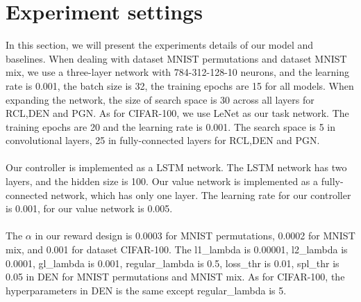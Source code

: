 \documentclass{article}
\begin{document}
\section{Experiment settings}
In this section, we will present the experiments details of our model and baselines. When dealing with dataset MNIST permutations and dataset MNIST mix, we use a three-layer network with 784-312-128-10 neurons, and the learning rate is 0.001, the batch size is 32, the training epochs are 15 for all models. When expanding the network, the size of search space is 30 across all layers for RCL,DEN and PGN. As for CIFAR-100, we use LeNet as our task network. The training epochs are 20 and the learning rate is 0.001. The search space is 5 in convolutional layers, 25 in fully-connected layers for RCL,DEN and PGN. \\
\\
Our controller is implemented as a LSTM network. The LSTM network has two layers, and the hidden size is 100. Our value network is implemented as a fully-connected network, which has only one layer. The learning rate for our controller is 0.001, for our value network is 0.005. \\
\\
The $\alpha$ in our reward design is 0.0003 for MNIST permutations, 0.0002 for MNIST mix, and 0.001 for dataset CIFAR-100. The l1\_lambda is 0.00001, l2\_lambda is 0.0001, gl\_lambda is 0.001, regular\_lambda is 0.5, loss\_thr is 0.01, spl\_thr is 0.05 in DEN for MNIST permutations and MNIST mix. As for CIFAR-100, the hyperparameters in DEN is the same except regular\_lambda is 5.
\end{document}
